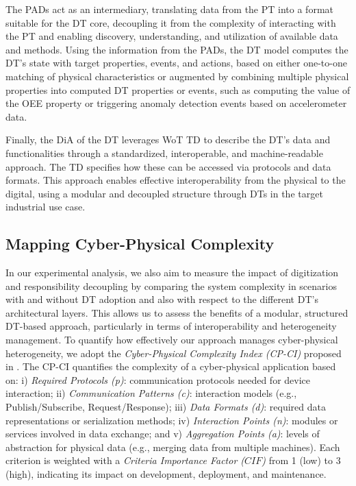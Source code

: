 The \acp{PAD} act as an intermediary, translating data from the PT into a format suitable for the DT core, decoupling it from the complexity of interacting with the \ac{PT} and enabling discovery, understanding, and utilization of available data and methods.
Using the information from the \acp{PAD}, the \ac{DT} model computes the \ac{DT}'s state with target properties, events, and actions, based on either one-to-one matching of physical characteristics or augmented by combining multiple physical properties into computed \ac{DT} properties or events, such as computing the value of the \ac{OEE} property or triggering anomaly detection events based on accelerometer data. 

Finally, the \ac{DiA} of the \ac{DT} leverages \ac{WoT} \ac{TD} to describe the DT's data and functionalities through a standardized, interoperable, and machine-readable approach.
The \ac{TD} specifies how these can be accessed via protocols and data formats.
This approach enables effective interoperability from the physical to the digital, using a modular and decoupled structure through \acp{DT} in the target industrial use case.

\subsection{Mapping Cyber-Physical Complexity}
\label{sec:mappint_cp_complexity}

In our experimental analysis, we also aim to measure the impact of digitization and responsibility decoupling by comparing the system complexity in scenarios with and without \ac{DT} adoption and also with respect to the different \ac{DT}'s architectural layers.
This allows us to assess the benefits of a modular, structured DT-based approach, particularly in terms of interoperability and heterogeneity management.
To quantify how effectively our approach manages cyber-physical heterogeneity, we adopt the \textit{Cyber-Physical Complexity Index (CP-CI)} proposed in \cite{lippi_dt_causality_learning, LOMBARDO2024107203}.
The CP-CI quantifies the complexity of a cyber-physical application based on:
i) \textit{Required Protocols (p)}: communication protocols needed for device interaction;
ii) \textit{Communication Patterns (c)}: interaction models (e.g., Publish/Subscribe, Request/Response);
iii) \textit{Data Formats (d)}: required data representations or serialization methods;
iv) \textit{Interaction Points (n)}: modules or services involved in data exchange; and
v) \textit{Aggregation Points (a)}: levels of abstraction for physical data (e.g., merging data from multiple machines).
Each criterion is weighted with a \textit{Criteria Importance Factor ($CIF$)} from 1 (low) to 3 (high), indicating its impact on development, deployment, and maintenance.

